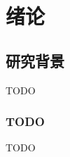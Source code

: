 \chapter{绪论}
\label{chap:introduction}

\section{研究背景}
\label{sec:background}

TODO

\subsection{TODO}
\label{ssec:todo}

TODO

